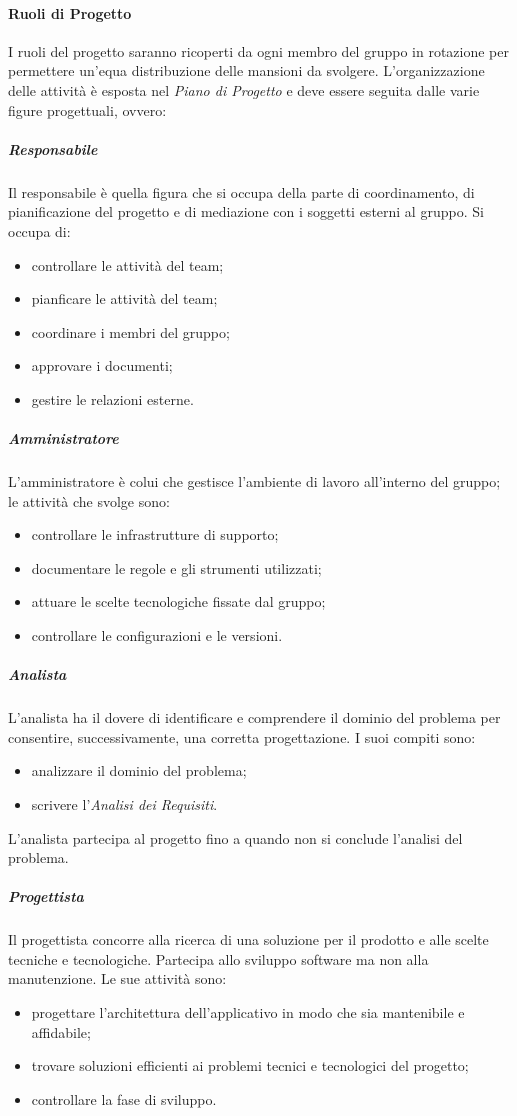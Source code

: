 \paragraph{Ruoli di Progetto}
I ruoli del progetto saranno ricoperti da ogni membro del gruppo in rotazione per permettere
un'equa distribuzione delle mansioni da svolgere. L'organizzazione delle attività
è esposta nel \emph{Piano di Progetto} e deve essere seguita dalle varie figure progettuali, ovvero:

\subparagraph*{Responsabile} \hfill \break
Il responsabile è quella figura che si occupa della parte di coordinamento, di pianificazione del progetto 
e di mediazione con i soggetti esterni al gruppo. Si occupa di:
\begin{itemize}
    \item controllare le attività del team;
    \item pianficare le attività del team;
    \item coordinare i membri del gruppo;
    \item approvare i documenti;
    \item gestire le relazioni esterne.
\end{itemize}

\subparagraph*{Amministratore} \hfill \break
L'amministratore è colui che gestisce l'ambiente di lavoro all'interno del gruppo; le attività che svolge sono:
\begin{itemize}
    \item controllare le infrastrutture di supporto;
    \item documentare le regole e gli strumenti utilizzati;
    \item attuare le scelte tecnologiche fissate dal gruppo;
    \item controllare le configurazioni e le versioni.
\end{itemize}

\subparagraph*{Analista} \hfill \break
L'analista ha il dovere di identificare e comprendere il dominio del problema per consentire, successivamente,
una corretta progettazione. I suoi compiti sono:
\begin{itemize}
    \item analizzare il dominio del problema;
    \item scrivere l'\emph{Analisi dei Requisiti}.
\end{itemize}
L'analista partecipa al progetto fino a quando non si conclude l'analisi del problema.

\subparagraph*{Progettista} \hfill \break
Il progettista concorre alla ricerca di una soluzione per il prodotto e alle scelte tecniche e tecnologiche.
Partecipa allo sviluppo software ma non alla manutenzione. Le sue attività sono:
\begin{itemize}
    \item progettare l'architettura dell'applicativo in modo che sia mantenibile e affidabile;
    \item trovare soluzioni efficienti ai problemi tecnici e tecnologici del progetto;
    \item controllare la fase di sviluppo.
\end{itemize}

